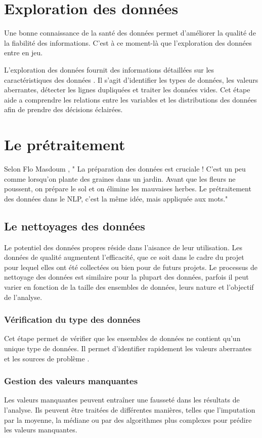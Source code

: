 \section{Exploration des données}
Une bonne connaissance de la santé des données permet d'améliorer la qualité de la fiabilité des informations. C'est à ce moment-là que l'exploration des données entre en jeu.\par
L'exploration des données fournit des informations détaillées sur les caractéristiques des données \cite{astera_blog}. Il s'agit d'identifier les types de données, les valeurs aberrantes, détecter les lignes dupliquées et traiter les données vides. Cet étape aide a comprendre les relations entre les variables et  les distributions des données afin de prendre des décisions éclairées. 

\section{Le prétraitement}
Selon Flo Masdoum \cite{masdoum2023} , " La préparation des données est cruciale ! C'est un peu comme lorsqu'on plante des graines dans un jardin. Avant que les fleurs ne poussent, on prépare le sol et on élimine les mauvaises herbes. Le prétraitement des données dans le NLP, c'est la même idée, mais appliquée aux mots."


\subsection{Le nettoyages des données}
Le potentiel des données propres réside dans l’aisance de leur utilisation. Les données de qualité augmentent l’efficacité, que ce soit dans le cadre du projet pour lequel elles ont été collectées ou bien pour de futurs projets\cite{data_bird_blog}. Le processus de nettoyage des données est similaire pour la plupart des données, parfois il peut varier en fonction de la taille des ensembles de données, leurs nature et l'objectif de l'analyse. 
\subsubsection{Vérification du type des données}
Cet étape permet de vérifier que les ensembles de données ne contient qu’un unique type de données. Il permet d’identifier rapidement les valeurs aberrantes et les sources de problème \cite{data_bird_blog}. 
\subsubsection{ Gestion des valeurs manquantes}
Les valeurs manquantes peuvent entraîner une fausseté dans les résultats de l'analyse. Ils peuvent être traitées de différentes manières, telles que l'imputation par la moyenne, la médiane ou par des algorithmes plus complexes pour prédire les valeurs manquantes.
